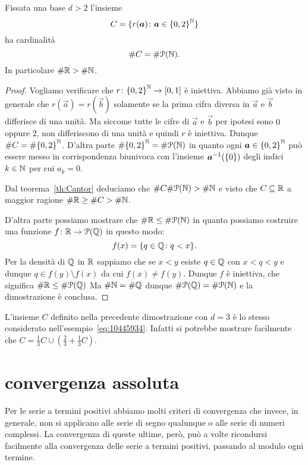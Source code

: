 \begin{theorem}[Cantor]
  \label{th:cantor_secondo}
Fissata una base $d>2$ l'insieme 
\[
  C = \{r(\boldsymbol a)\colon \boldsymbol a \in {\left\{ 0,2 \right\}}^\mathbb N\}
\]
ha cardinalità
\[
\# C = \# \mathcal P(\mathbb N).
\]
In particolare $\#\mathbb R > \#\mathbb N$.
\end{theorem}
%
\begin{proof}
Vogliamo verificare che $r\colon {\left\{ 0,2 \right\}}^\mathbb N \to \left[0,1\right]$
è iniettiva.
Abbiamo già visto in generale che $r(\vec a) = r(\vec b)$ solamente 
se la prima cifra diversa in $\vec a$ e $\vec b$ differisce di una unità.
Ma siccome tutte le cifre di $\vec a$ e $\vec b$ per ipotesi sono $0$ oppure 
$2$, non differiscono di una unità e quindi $r$ è iniettiva.
Dunque $\# C = \#{\left\{ 0,2 \right\}}^\mathbb N$.
D'altra parte $\#{\left\{ 0,2 \right\}}^\mathbb N = \#\mathcal P(\mathbb N)$ in quanto 
ogni $\boldsymbol a \in {\left\{ 0,2 \right\}}^\mathbb N$ può essere messo in corrispondenza 
biunivoca con l'insieme $\boldsymbol a^{-1}({\left\{ 0 \right\}})$ degli indici $k\in \mathbb N$
per cui $a_k=0$.

Dal teorema~\ref{th:Cantor} deduciamo che $\# C \#\mathcal P(\mathbb N) > \#\mathbb N$ 
e visto che $C\subseteq \mathbb R$ a maggior ragione $\# \mathbb R \ge \# C >\#\mathbb N$.

D'altra parte possiamo mostrare che $\#\mathbb R \le \# \mathcal P(\mathbb N)$
in quanto possiamo costruire una funzione $f\colon \mathbb R \to \mathcal P(\mathbb Q)$
in questo modo:
\[
f(x) = {\left\{ q\in \mathbb Q\colon q<x \right\}}.
\]
Per la densità di $\mathbb Q$ in $\mathbb R$ sappiamo che se $x<y$ 
esiste $q\in \mathbb Q$ con $x<q<y$ e dunque $q\in f(y)\setminus f(x)$ 
da cui $f(x)\neq f(y)$. 
Dunque $f$ è iniettiva, che significa $\#\mathbb R\le \# \mathcal P(\mathbb Q)$
Ma $\#\mathbb N = \#\mathbb Q$ dunque $\#\mathcal P(\mathbb Q) = \#\mathcal P(\mathbb N)$ 
e la dimostrazione è conclusa.
\end{proof}

L'insieme $C$ definito nella precedente dimostrazione con $d=3$ 
è lo stesso  considerato nell'esempio~\ref{eq:10445934}.
Infatti si potrebbe mostrare facilmente che 
$C=\frac 1 3 C \cup (\frac 2 3 + \frac 1 3 C)$.

\section{convergenza assoluta}

Per le serie a termini positivi abbiamo molti criteri di convergenza
che invece, in generale, non si applicano alle serie di segno qualunque
o alle serie di numeri complessi.
La convergenza di queste ultime, però, può a volte ricondursi
facilmente
alla
convergenza delle serie a termini positivi, passando al modulo
ogni termine.

